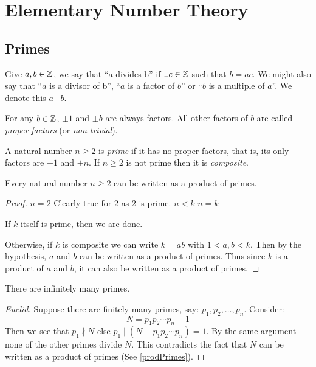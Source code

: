 \documentclass[../main.tex]{subfiles}
\begin{document}
\chapter{Elementary Number Theory}
\section{Primes}
\begin{definition}[Divisibility]
  Give $a, b \in \mathbb{Z}$, we say that ``a divides b'' if $\exists c \in \mathbb{Z}$ such that $b = ac$.
  We might also say that ``$a$ is a divisor of b'', ``$a$ is a factor of $b$'' or ``$b$ is a multiple of $a$''.
  We denote this $a \mid b$.
\end{definition}
For any $b \in \mathbb{Z}$, $\pm1$ and $\pm b$ are always factors.
All other factors of $b$ are called \textit{proper factors} (or \textit{non-trivial}).
\begin{definition}
  A natural number $n \geq 2$ is \textit{prime} if it has no proper factors, that is, its only factors are $\pm 1$ and $\pm n$.
  If $n \geq 2$ is not prime then it is \textit{composite}.
\end{definition}
\begin{proposition}
  Every natural number $n \geq 2$ can be written as a product of primes.
  \label{prodPrimes}
\end{proposition}
\begin{proof}
  \induction
  {$n = 2$}{
    Clearly true for $2$ as $2$ is prime.
  }
  {$n < k$}{}
  {$n = k$}{
     If $k$ itself is prime, then we are done.

     Otherwise, if $k$ is composite we can write $k = ab$ with $1 < a, b < k$.
     Then by the hypothesis, $a$ and $b$ can be written as a product of primes.
     Thus since $k$ is a product of $a$ and $b$, it can also be written as a product of primes.
  }
\end{proof}
\begin{theorem}
  There are infinitely many primes.
  \label{infinityPrimes}
\end{theorem}
\begin{proof}[Euclid]
  Suppose there are finitely many primes, say: $p_1, p_2, \ldots, p_n$. Consider:
  \[
    N = p_1 p_2 \cdots p_n + 1
  \]
  Then we see that $p_1 \nmid N$ else $p_1 \mid (N - p_1 p_2 \cdots p_n) = 1$.
  By the same argument none of the other primes divide $N$.
  This contradicts the fact that $N$ can be written as a product of primes (See \cref{prodPrimes}).
\end{proof}
\end{document}
